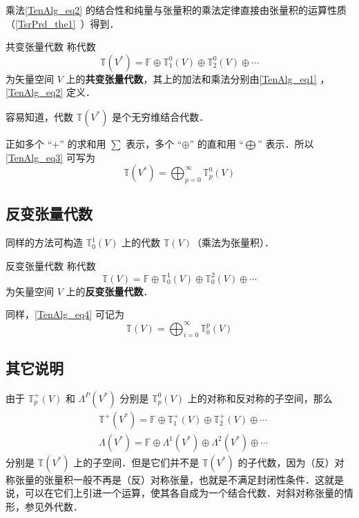 乘法\autoref{TenAlg_eq2} 的结合性和纯量与张量积的乘法定律直接由张量积的运算性质（\autoref{TsrPrd_the1}~）得到．

\begin{definition}{共变张量代数}
称代数
\begin{equation}\label{TenAlg_eq3}
\mathbb T(V^*)=\mathbb F\oplus\mathbb T_1^0(V)\oplus\mathbb T_2^0(V)\oplus\cdots
\end{equation}
为矢量空间 $V$ 上的\textbf{共变张量代数}，其上的加法和乘法分别由\autoref{TenAlg_eq1} ，\autoref{TenAlg_eq2} 定义．
\end{definition}

容易知道，代数 $\mathbb T(V^*)$ 是个无穷维结合代数．

正如多个 “+” 的求和用 $\sum$ 表示，多个 “$\oplus$” 的直和用 “$\bigoplus$” 表示．所以\autoref{TenAlg_eq3} 可写为
\begin{equation}
\mathbb T(V^*)=\bigoplus_{p=0}^\infty\mathbb T_p^0(V)
\end{equation}
 
\subsection{反变张量代数}
同样的方法可构造 $\mathbb T^1_0(V)$ 上的代数 $\mathbb T(V)$（乘法为张量积）．
\begin{definition}{反变张量代数}
称代数
\begin{equation}\label{TenAlg_eq4}
\mathbb T(V)=\mathbb F\oplus\mathbb T_0^1(V)\oplus\mathbb T_0^2(V)\oplus\cdots
\end{equation}
为矢量空间 $V$ 上的\textbf{反变张量代数}．
\end{definition}

同样，\autoref{TenAlg_eq4} 可记为
\begin{equation}
\mathbb T(V)=\bigoplus_{i=0}^\infty \mathbb T_0^p(V)
\end{equation}

\subsection{其它说明}
由于 $\mathbb T_p^+(V)$ 和 $\Lambda^P(V^*)$ 分别是 $\mathbb T_p^0(V)$ 上的对称和反对称的子空间，那么
\begin{equation}
\begin{aligned}
&\mathbb T^+(V^*)=\mathbb F\oplus\mathbb T_1^+(V)\oplus\mathbb T_2^+(V)\oplus\cdots\\
&\Lambda(V^*)=\mathbb F\oplus \Lambda^1(V^*)\oplus\Lambda^2(V^*)\oplus\cdots
\end{aligned}
\end{equation}
分别是 $\mathbb T(V^*)$ 上的子空间．但是它们并不是 $\mathbb T(V^*)$ 的子代数，因为（反）对称张量的张量积一般不再是（反）对称张量，也就是不满足封闭性条件．这就是说，可以在它们上引进一个运算，使其各自成为一个结合代数．对斜对称张量的情形，参见外代数．